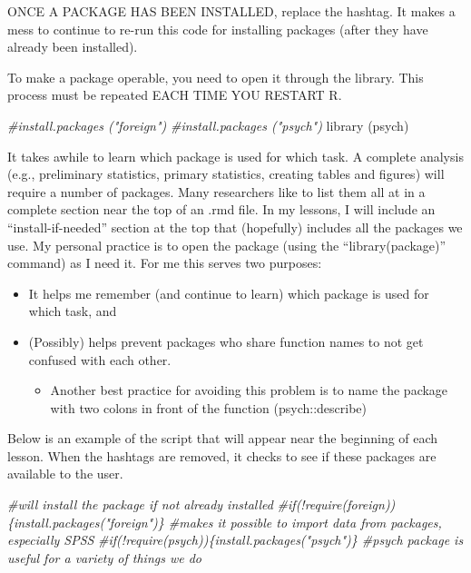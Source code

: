 \documentclass[
  english,
]{book}
\newenvironment{Shaded}{\begin{snugshade}}{\end{snugshade}}
\newcommand{\CommentTok}[1]{\textcolor[rgb]{0.56,0.35,0.01}{\textit{#1}}}
\newcommand{\FunctionTok}[1]{\textcolor[rgb]{0.00,0.00,0.00}{#1}}
\newcommand{\NormalTok}[1]{#1}
\providecommand{\tightlist}{%
  \setlength{\itemsep}{0pt}\setlength{\parskip}{0pt}}
\begin{document}
ONCE A PACKAGE HAS BEEN INSTALLED, replace the hashtag. It makes a mess to continue to re-run this code for installing packages (after they have already been installed).

To make a package operable, you need to open it through the library. This process must be repeated EACH TIME YOU RESTART R.

\begin{Shaded}
\begin{Highlighting}[]
\CommentTok{\#install.packages ("foreign")}
\CommentTok{\#install.packages ("psych")}
\FunctionTok{library}\NormalTok{ (psych)}
\end{Highlighting}
\end{Shaded}

It takes awhile to learn which package is used for which task. A complete analysis (e.g., preliminary statistics, primary statistics, creating tables and figures) will require a number of packages. Many researchers like to list them all at in a complete section near the top of an .rmd file. In my lessons, I will include an ``install-if-needed'' section at the top that (hopefully) includes all the packages we use. My personal practice is to open the package (using the ``library(package)'' command) as I need it. For me this serves two purposes:

\begin{itemize}
\tightlist
\item
  It helps me remember (and continue to learn) which package is used for which task, and
\item
  (Possibly) helps prevent packages who share function names to not get confused with each other.

  \begin{itemize}
  \tightlist
  \item
    Another best practice for avoiding this problem is to name the package with two colons in front of the function (psych::describe)
  \end{itemize}
\end{itemize}

Below is an example of the script that will appear near the beginning of each lesson. When the hashtags are removed, it checks to see if these packages are available to the user.

\begin{Shaded}
\begin{Highlighting}[]
\CommentTok{\#will install the package if not already installed}
\CommentTok{\#if(!require(foreign))\{install.packages("foreign")\} \#makes it possible to import data from packages, especially SPSS}
\CommentTok{\#if(!require(psych))\{install.packages("psych")\} \#psych package is useful for a variety of things we do}
\end{Highlighting}
\end{Shaded}
\end{document}
